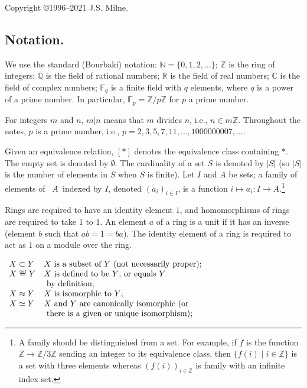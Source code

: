 \documentclass[a4paper,11pt,final,openany]{memoir}%
\theoremstyle{nonumberplain}
\begin{document}
\noindent Copyright \copyright 1996--2021 J.S. Milne.




\setcounter{page}{2}
\clearpage\pagestyle{plain}
\vspace*{-0.5in}\tableoc


\clearpage


\subsection{Notation.}

\sloppy We use the standard (Bourbaki) notation: $\mathbb{N}=\{0,1,2,\ldots\}$;
$\mathbb{Z}$ is the ring of integers; $\mathbb{Q}{}$ is the field of rational
numbers; $\mathbb{R}{}$ is the field of real numbers; $\mathbb{C}{}$ is the
field of complex numbers; $\mathbb{F}_{q}$ is a finite field with $q$
elements, where $q$ is a power of a prime number. In particular,
$\mathbb{F}_{p}=\mathbb{Z}{}/p\mathbb{Z}{}$ for $p$ a prime number.

For integers $m$ and $n$, $m|n$ means that $m$ divides $n$, i.e., $n\in
m\mathbb{Z}{}$. Throughout the notes, $p$ is a prime number, i.e.,
$p=2,3,5,7,11,\ldots,1000000007,\ldots$.

Given an equivalence relation, $[\ast]$ denotes the equivalence class
containing $\ast$. The empty set is denoted by $\emptyset$. The cardinality of
a set $S$ is denoted by $|S|$ (so $|S|$ is the number of elements in $S$ when
$S$ is finite). Let $I$ and $A$ be sets; a family of elements of\emph{\ }%
$A$\emph{\ }indexed by $I$, denoted $(a_{i})_{i\in I}$, is a function
$i\mapsto a_{i}\colon I\rightarrow A$.\footnote{A family should be
distinguished from a set. For example, if $f$ is the function $\mathbb{Z}%
{}\rightarrow\mathbb{Z}{}/3\mathbb{Z}{}$ sending an integer to its equivalence
class, then $\{f(i)\mid i\in\mathbb{Z\}}$ is a set with three elements whereas
$(f(i))_{i\in\mathbb{Z}{}}$ is family with an infinite index set.}

Rings are required to have an identity element $1$, and homomorphisms of rings
are required to take $1$ to $1$. An element $a$ of a ring is a unit if it has
an inverse (element $b$ such that $ab=1=ba$). The identity element of a ring
is required to act as $1$ on a module over the ring.

\noindent$%
\begin{array}
[c]{ll}%
X\subset Y & X\text{ is a subset of }Y\text{ (not necessarily proper);}\\
X\overset{\df}{=}Y & X\text{ is defined to be }Y\text{, or
  equals }Y \\
& \text{ by definition;}\\
X\approx Y & X\text{ is isomorphic to }Y\text{;}\\
X\simeq Y & X\text{ and }Y\text{ are canonically isomorphic (or}\\
& \text{ there is a
given or unique isomorphism);}%
\end{array}
$
\end{document}
